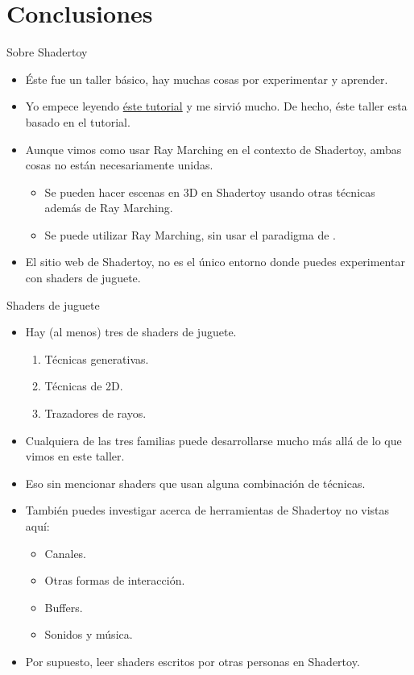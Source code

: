\section{Conclusiones}

\begin{frame}{Sobre Shadertoy}
\begin{itemize}
    \item Éste fue un taller básico, hay muchas cosas por experimentar y aprender.
    \item Yo empece leyendo \href{https://inspirnathan.com/posts/47-shadertoy-tutorial-part-1}{éste tutorial} y me sirvió mucho. De hecho, éste taller esta basado en el tutorial.
    \item Aunque vimos como usar Ray Marching en el contexto de Shadertoy, ambas cosas no están necesariamente unidas.
    \begin{itemize}
        \item Se pueden hacer escenas en 3D en Shadertoy usando otras técnicas además de Ray Marching.
        \item Se puede utilizar Ray Marching, sin usar el paradigma de .
    \end{itemize}
    \item El sitio web de Shadertoy, no es el único entorno donde puedes experimentar con shaders de juguete.
\end{itemize}
\end{frame}

\begin{frame}{Shaders de juguete}
\begin{itemize}
     \item Hay (al menos) tres  de shaders de juguete.
     \begin{enumerate}
        \item Técnicas generativas.
        \item Técnicas de 2D.
        \item Trazadores de rayos.         
     \end{enumerate}
     \item Cualquiera de las tres familias puede desarrollarse mucho más allá de lo que vimos en este taller.
     \item Eso sin mencionar shaders que usan alguna combinación de técnicas.
     \item También puedes investigar acerca de herramientas de Shadertoy no vistas aquí:
     \begin{itemize}
        \item Canales.
        \item Otras formas de interacción.
        \item Buffers.
        \item Sonidos y música.
     \end{itemize}
     \item Por supuesto, leer shaders escritos por otras personas en Shadertoy.
 \end{itemize}
\end{frame}


